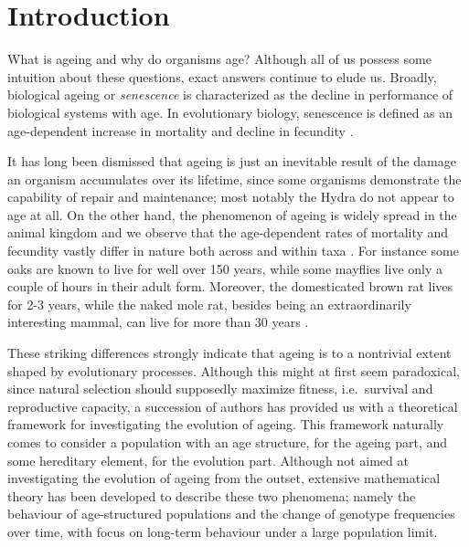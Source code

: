 \documentclass[11pt, a4paper]{article}
\theoremstyle{definition}
\begin{document}

\section{Introduction}
    What is ageing and why do organisms age? Although all of us possess some intuition about these questions, exact answers continue to elude us. Broadly, biological ageing or \emph{senescence} is characterized as the decline in performance of biological systems with age. In evolutionary biology, senescence is defined as an age-dependent increase in mortality and decline in fecundity \autocite{rose1991}.
    
    It has long been dismissed that ageing is just an inevitable result of the damage an organism accumulates over its lifetime, since some organisms demonstrate the capability of repair and maintenance; most notably the Hydra do not appear to age at all. On the other hand, the phenomenon of ageing is widely spread in the animal kingdom and we observe that the age-dependent rates of mortality and fecundity vastly differ in nature both across and within taxa \autocite{jones2014diversity}. For
    instance some oaks are known to live for well over 150 years, while some mayflies live only a couple of hours in their adult form. Moreover, the domesticated brown rat lives for 2-3 years, while the naked mole rat, besides being an extraordinarily interesting mammal, can live for more than 30 years \autocite{naked-mole-rat}.

    These striking differences strongly indicate that ageing is to a nontrivial extent shaped by evolutionary processes. Although this might at first seem paradoxical, since natural selection should supposedly maximize fitness, i.e.\ survival and reproductive capacity, a succession of authors has provided us with a theoretical framework for investigating the evolution of ageing. 
    This framework naturally comes to consider a population with an age structure, for the ageing part, and some hereditary element, for the evolution part.
    Although not aimed at investigating the evolution of ageing from the outset, extensive mathematical theory has been developed to describe these two phenomena; namely the behaviour of age-structured populations and the change of genotype frequencies over time, with focus on long-term behaviour under a large population limit.
\end{document}
